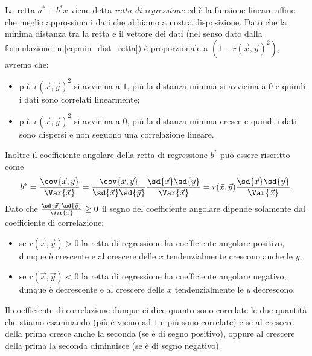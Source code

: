 La retta $a^\ast + b^\ast x$ viene detta \emph{retta di regressione} ed è la funzione lineare affine che meglio approssima i dati che abbiamo a nostra disposizione. Dato che la minima distanza tra la retta e il vettore dei dati (nel senso dato dalla formulazione in \eqref{eq:min_dist_retta}) è proporzionale a $\left(1 - r(\vec x, \vec y)^2\right)$, avremo che: \begin{itemize}
    \item più $r(\vec x, \vec y)^2$ si avvicina a $1$, più la distanza minima si avvicina a $0$ e quindi i dati sono correlati linearmente;
    \item più $r(\vec x, \vec y)^2$ si avvicina a $0$, più la distanza minima cresce e quindi i dati sono dispersi e non seguono una correlazione lineare.
\end{itemize}
Inoltre il coefficiente angolare della retta di regressione $b^\ast$ può essere riscritto come \[
    b^\ast = \frac{\cov{\vec x, \vec y}}{\Var{\vec x}} = \frac{\cov{\vec x, \vec y}}{\sd{\vec x}\sd{\vec y}}\frac{\sd{\vec x}\sd{\vec y}}{\Var{\vec x}} = r(\vec x, \vec y)\frac{\sd{\vec x}\sd{\vec y}}{\Var{\vec x}}.
\] Dato che $\frac{\sd{\vec x}\sd{\vec y}}{\Var{\vec x}} \geq 0$ il segno del coefficiente angolare dipende solamente dal coefficiente di correlazione: \begin{itemize}
    \item se $r(\vec x, \vec y) > 0$ la retta di regressione ha coefficiente angolare positivo, dunque è crescente e al crescere delle $x$ tendenzialmente crescono anche le $y$;
    \item se $r(\vec x, \vec y) < 0$ la retta di regressione ha coefficiente angolare negativo, dunque è decrescente e al crescere delle $x$ tendenzialmente le $y$ decrescono.
\end{itemize}

Il coefficiente di correlazione dunque ci dice quanto sono correlate le due quantità che stiamo esaminando (più è vicino ad $1$ e più sono correlate) e se al crescere della prima cresce anche la seconda (se è di segno positivo), oppure al crescere della prima la seconda diminuisce (se è di segno negativo).